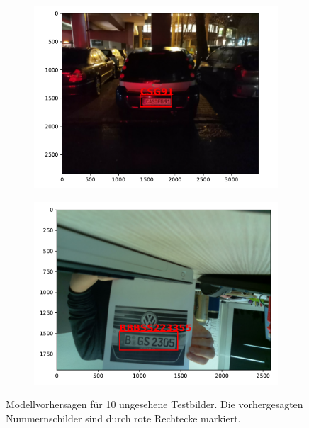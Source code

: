 \begin{figure}
    \begin{subfigure}{0.31\textwidth}
        \includegraphics[width=\textwidth]{abbildungen/prediction_09.pdf}
    \end{subfigure}
    \begin{subfigure}{0.31\textwidth}
        \includegraphics[width=\textwidth]{abbildungen/prediction_10.pdf}
    \end{subfigure}
    \caption[Modellvorhersagen]{Modellvorhersagen f\"ur 10 ungesehene Testbilder.
        Die vorhergesagten Nummernschilder sind durch rote Rechtecke markiert.}
    \label{fig:modellvorhersagen}
\end{figure}

